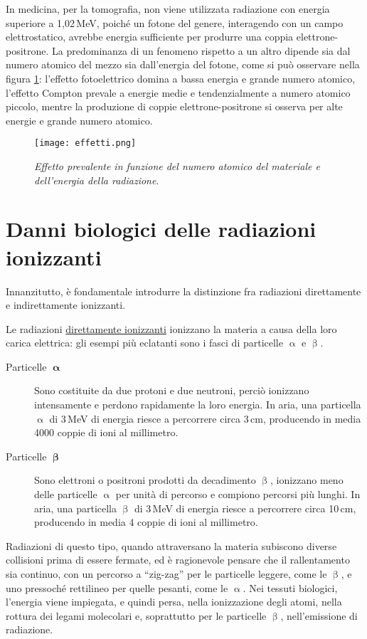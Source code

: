 \documentclass{report}
\newcommand{\virgolette}[1]{``#1''}
\newcommand{\figref}[1]{figura \ref{#1}}
\numberwithin{equation}{section}
\numberwithin{figure}{section}
\begin{document}
In medicina, per la tomografia, non viene utilizzata radiazione con energia superiore a 1,02\,MeV, poiché un fotone del genere, interagendo con un campo elettrostatico, avrebbe energia sufficiente per produrre una coppia elettrone-positrone. La predominanza di un fenomeno rispetto a un altro dipende sia dal numero atomico del mezzo sia dall'energia del fotone, come si può osservare nella \figref{fig:effetti}: l'effetto fotoelettrico domina a bassa energia e grande numero atomico, l'effetto Compton prevale a energie medie e tendenzialmente a numero atomico piccolo, mentre la produzione di coppie elettrone-positrone si osserva per alte energie e grande numero atomico.

\begin{figure}[htp]
\centering
\texttt{[image: effetti.png]}
\caption{\label{fig:effetti} \textit{Effetto prevalente in funzione del numero atomico del materiale e dell'energia della radiazione}.}
\end{figure}

\section{Danni biologici delle radiazioni ionizzanti}
Innanzitutto, è fondamentale introdurre la distinzione fra radiazioni direttamente e indirettamente ionizzanti.

Le radiazioni \underline{direttamente ionizzanti} ionizzano la materia a causa della loro carica elettrica: gli esempi più eclatanti sono i fasci di particelle $\upalpha$ e $\upbeta$.
\begin{description}
    \item[Particelle $\bm{\upalpha}$] Sono costituite da due protoni e due neutroni, perciò ionizzano intensamente e perdono rapidamente la loro energia. In aria, una particella $\upalpha$ di 3\,MeV di energia riesce a percorrere circa 3\,cm, producendo in media 4000 coppie di ioni al millimetro.
    \item[Particelle $\bm{\upbeta}$] Sono elettroni o positroni prodotti da decadimento $\upbeta$, ionizzano meno delle particelle $\upalpha$ per unità di percorso e compiono percorsi più lunghi. In aria, una particella $\upbeta$ di 3\,MeV di energia riesce a percorrere circa 10\,cm, producendo in media 4 coppie di ioni al millimetro.
\end{description}
Radiazioni di questo tipo, quando attraversano la materia subiscono diverse collisioni prima di essere fermate, ed è ragionevole pensare che il rallentamento sia continuo, con un percorso a \virgolette{zig-zag} per le particelle leggere, come le $\upbeta$, e uno pressoché rettilineo per quelle pesanti, come le $\upalpha$. Nei tessuti biologici, l'energia viene impiegata, e quindi persa, nella ionizzazione degli atomi, nella rottura dei legami molecolari e, soprattutto per le particelle $\upbeta$, nell'emissione di radiazione.
\end{document}
